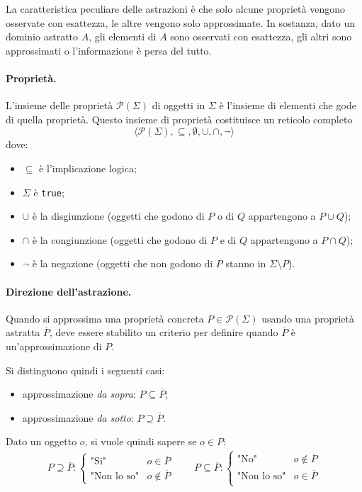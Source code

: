 \documentclass[a4paper, 10pt]{book}
\newcommand{\parts}[1]{\mathcal{P}(#1)}
\begin{document}
	La caratteristica peculiare delle astrazioni è che solo alcune proprietà vengono osservate con esattezza, le altre vengono solo approssimate. In sostanza, dato un dominio astratto $A$, gli elementi di $A$ sono osservati con esattezza, gli altri sono approssimati o l'informazione è persa del tutto.
	
	\paragraph{Proprietà.} L'insieme delle proprietà $\parts{\Sigma}$ di oggetti in $\Sigma$ è l'insieme di elementi che gode di quella proprietà. Questo insieme di proprietà costituisce un reticolo completo \[ \langle \parts{\Sigma}, \subseteq, \emptyset, \cup, \cap, \neg \rangle \] dove:
	\begin{itemize}
		\item $\subseteq$ è l'implicazione logica;
		\item $\Sigma$ è \verb|true|;
		\item $\cup$ è la disgiunzione (oggetti che godono di $P$ o di $Q$ appartengono a $P \cup Q$);
		\item $\cap$ è la congiunzione (oggetti che godono di $P$ e di $Q$ appartengono a $P \cap Q$);
		\item $\neg$ è la negazione (oggetti che non godono di $P$ stanno in $\Sigma \setminus P$).
	\end{itemize}

	\paragraph{Direzione dell'astrazione.}
	Quando si approssima una proprietà concreta $P \in \parts{\Sigma}$ usando una proprietà astratta $\overline{P}$, deve essere stabilito un criterio per definire quando $\overline{P}$ è un'approssimazione di $P$.
	
	Si distinguono quindi i seguenti casi:
	\begin{itemize}
		\item approssimazione \textit{da sopra}: $P \subseteq \overline{P}$;
		\item approssimazione \textit{da sotto}: $P \supseteq \overline{P}$.
	\end{itemize}
	
	Dato un oggetto $o$, si vuole quindi sapere se $o \in P$:
	\begin{align*}
		P \supseteq \overline{P}: \begin{cases}
			\text{"Si"} &o \in \overline{P} \\
			\text{"Non lo so"} &o \notin  \overline{P}
		\end{cases} \qquad
		P \subseteq \overline{P}: \begin{cases}
		\text{"No"} &o \notin \overline{P} \\
		\text{"Non lo so"} &o \in \overline{P}\\
		\end{cases}
	\end{align*} 
	
\end{document}
